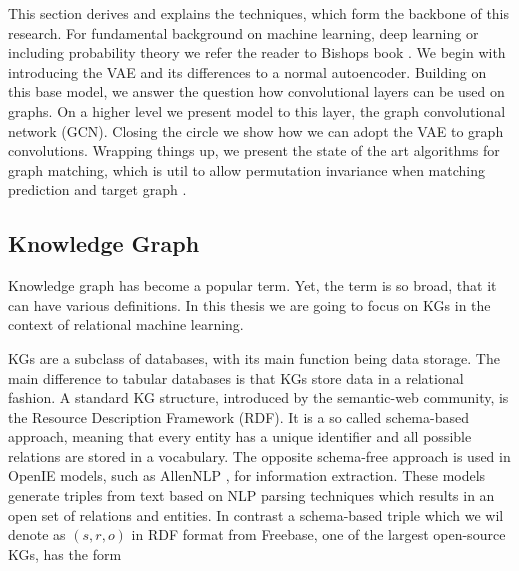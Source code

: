 

This section derives and explains the techniques, which form the backbone of this research. For fundamental background on machine learning, deep learning or including probability theory we refer the reader to Bishops book \cite{bishop_pattern_2006}. We begin with introducing the VAE and its differences to a normal autoencoder. Building on this base model, we answer the question how convolutional layers can be used on graphs. On a higher level we present model to this layer, the graph convolutional network (GCN). Closing the circle we show how we can adopt the VAE to graph convolutions. Wrapping things up, we present the state of the art algorithms for graph matching, which is util to allow permutation invariance when matching prediction and target graph \cite{paulheim_knowledge_2016}.  


\subsection{Knowledge Graph}

Knowledge graph has become a popular term. Yet, the term is so broad, that it can have various definitions. In this thesis we are going to focus on KGs in the context of relational machine learning.

KGs are a subclass of databases, with its main function being data storage. The main difference to tabular databases is that KGs store data in a relational fashion. A standard KG structure, introduced by the semantic-web community, is the Resource Description Framework (RDF). It is a so called schema-based approach, meaning that every entity has a unique identifier and all possible relations are stored in a vocabulary. The opposite schema-free approach is used in OpenIE models, such as AllenNLP \cite{gardner_allennlp_2018}, for information extraction. These models generate triples from text based on NLP parsing techniques which results in an open set of relations and entities. In contrast a schema-based triple which we wil denote as $(s,r,o)$ in RDF format from Freebase, one of the largest open-source KGs, has the form


